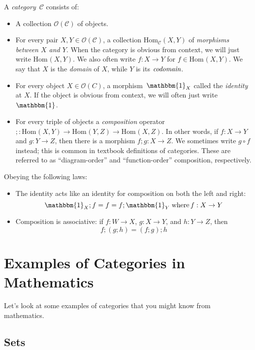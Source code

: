 \documentclass{lecturenotes}
\newcommand{\obj}[1]{\ensuremath{\mathcal{O}(#1)}}
\renewcommand{\hom}[3][]{\ensuremath{\text{Hom}_{#1}(#2, #3)}}
\newcommand{\id}[1][]{\ensuremath{\mathbbm{1}_{#1}}}
\begin{document}
\begin{defn}[Category]
  A \emph{category}~$\mathcal{C}$ consists of:
  \begin{itemize}
  \item A collection $\obj{\mathcal{C}}$ of objects.
  \item For every pair $X, Y \in \obj{\mathcal{C}}$, a collection $\hom[\mathcal{C}]{X}{Y}$ of \emph{morphisms between $X$ and $Y$}.
    When the category is obvious from context, we will just write $\hom{X}{Y}$.
    We also often write $f : X \to Y$ for $f \in \hom{X}{Y}$.
    We say that $X$ is the \emph{domain} of $X$, while $Y$ is its $\emph{codomain}$.
  \item For every object $X \in \obj{C}$, a morphism~$\id[X]$ called the \emph{identity} at $X$.
    If the object is obvious from context, we will often just write $\id$.
  \item For every triple of objects a \emph{composition} operator $; : \hom{X}{Y} \to \hom{Y}{Z} \to \hom{X}{Z}$.
    In other words, if $f : X \to Y$ and $g : Y \to Z$, then there is a morphism $f; g : X \to Z$.
    We sometimes write $g \circ f$ instead; this is common in textbook definitions of categories.
    These are referred to as ``diagram-order'' and ``function-order'' composition, respectively.
  \end{itemize}
  Obeying the following laws:
  \begin{itemize}
  \item The identity acts like an identity for composition on both the left and right:
    $$\id[X]; f = f = f; \id[Y] \;\text{where}\,f : X \to Y$$
  \item Composition is associative: if $f : W \to X$, $g : X \to Y$, and $h : Y \to Z$, then
    $$ f; (g; h) = (f; g); h$$
  \end{itemize}
\end{defn}

\section{Examples of Categories in Mathematics}
\label{sec:math-examples-categories}

Let's look at some examples of categories that you might know from mathematics.

\subsection{Sets}
\label{sec:sets}
\end{document}
